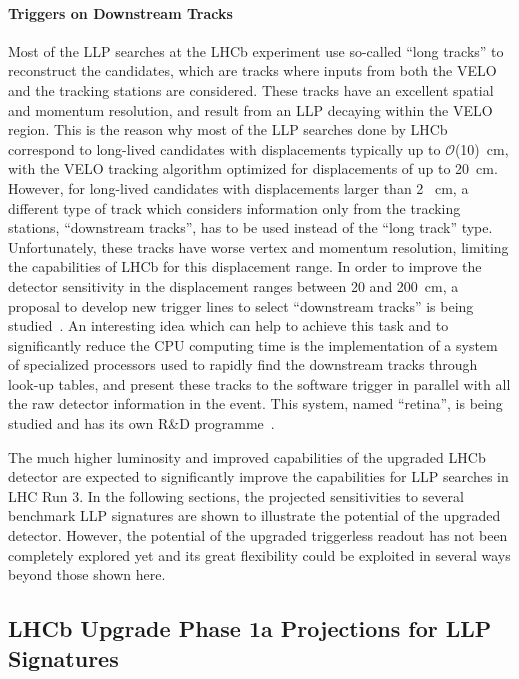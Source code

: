 \paragraph{Triggers on Downstream Tracks}

Most of the LLP searches at the LHCb experiment use so-called ``long tracks'' to reconstruct the candidates, which are tracks where inputs from both the VELO and the tracking stations are considered. These tracks have an excellent spatial and momentum resolution, and result from an LLP decaying within the VELO region. This is the reason why most of the LLP searches done by LHCb correspond to long-lived candidates with displacements typically up to $\mathcal{O}$(10)~cm, with the VELO tracking algorithm optimized for displacements of up to 20~cm. However, for long-lived candidates with displacements larger than 2~ cm, a different type of track which considers information only from the tracking stations, ``downstream tracks'', has to be used instead of the ``long track'' type. Unfortunately, these tracks have worse vertex and momentum resolution, limiting the capabilities of LHCb for this displacement range. In order to improve the detector sensitivity in the displacement ranges between 20 and 200~cm, a proposal to develop new trigger lines to select ``downstream tracks'' is being studied~\cite{Aaij:2244312}. An interesting idea which can help to achieve this task and to significantly reduce the CPU computing time is the implementation of a system of specialized processors used to rapidly find the downstream tracks through look-up tables, and present these tracks to the software trigger in parallel with all the raw detector information in the event. This system, named ``retina'', is being studied and has its own R\&D programme~\cite{Abba:2014iga}.

The much higher luminosity and improved capabilities of the upgraded LHCb detector are expected to significantly improve the capabilities for LLP searches in LHC Run 3. In the following sections, the projected sensitivities to several benchmark LLP signatures are shown to illustrate the potential of the upgraded detector. However, the potential of the upgraded triggerless readout has not been completely explored yet and its great flexibility could be exploited in several ways beyond those shown here.

\subsection{LHCb Upgrade Phase 1a Projections for LLP Signatures}
\label{sec:ulhcbphys}

